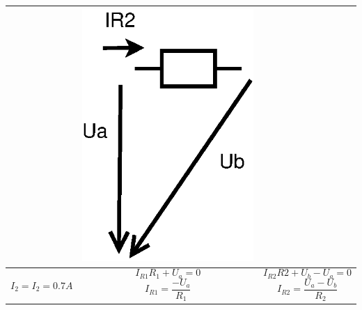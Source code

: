 \documentclass[a4paper, 12pt]{article}
\begin{document}
\begin{tabular}{|c|c|c|}
    & 
    \includegraphics[scale=0.5]{pr3/cc_13.eps}
    \\
    \hline
    \begin{minipage}{5cm}
        $I_2 = I_2 = 0.7A$
    \end{minipage}
    &
    \begin{minipage}{5cm}
        $$ I_{R1}R_1 + U_a = 0 $$
        $$ I_{R1} = \frac{-U_a}{ R_1} $$
    \end{minipage}
    &
    \begin{minipage}{5cm}
        $$ I_{R2}R2 + U_b - U_a = 0 $$
        $$ I_{R2} = \frac{U_a - U_b}{R_2} $$
    \end{minipage}
    
    \\
    \hline
    

\end{tabular}
\end{document}
